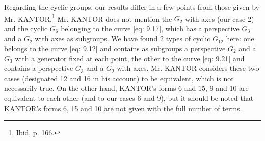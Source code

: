 \documentclass[leqno]{article}
\begin{document}
Regarding the cyclic groups, our results differ in a few points from those given by Mr. KANTOR.\footnote{Ibid, p. 166.} Mr. KANTOR does not mention the $G_2$ \guillemotright with axes\guillemotright{} (our case 2) and the cyclic $G_6$ belonging to the curve \eqref{eq: 9.17}, which has a perspective $G_3$ and a $G_2$ \guillemotright with axes\guillemotright{} as subgroups. We have found 2 types of cyclic $G_{12}$ here: one belongs to the curve \eqref{eq: 9.12} and contains as subgroups a perspective $G_2$ and a $G_3$ with a generator fixed at each point, the other to the curve \eqref{eq: 9.21} and contains a perspective $G_3$ and a $G_2$ \guillemotright with axes\guillemotright. Mr. KANTOR considers these two cases (designated 12 and 16 in his account) to be equivalent, which is not necessarily true. On the other hand, KANTOR's forms 6 and 15, 9 and 10 are equivalent to each other (and to our cases 6 and 9), but it should be noted that KANTOR's forms 6, 15 and 10 are not given with the full number of terms. 
\end{document}
